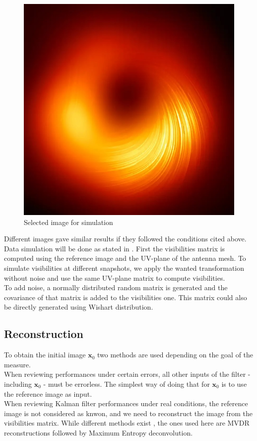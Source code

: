 \documentclass[titlepage]{article}
\newcommand{\x}{\boldsymbol{x}}
\begin{document}
	\begin{figure}[H]
		\centering
		\includegraphics[width=0.5\linewidth]{src/bh_square}
		\caption{Selected image for simulation}
		\label{fig:bhsquare}
	\end{figure}
	
	Different images gave similar results if they followed the conditions cited above.\\
	
	Data simulation will be done as stated in \cite{TER}. First the visibilities matrix is computed using the reference image and the UV-plane of the antenna mesh. To simulate visibilities at different snapshots, we apply the wanted transformation without noise and use the same UV-plane matrix to compute visibilities.\\
	
	To add noise, a normally distributed random matrix is generated and the covariance of that matrix is added to the visibilities one. This matrix could also be directly generated using Wishart distribution. \\ 
	
	\subsection{Reconstruction}
	
	To obtain the initial image $\x_0$ two methods are used depending on the goal of the measure. \\
	
	When reviewing performances under certain errors, all other inputs of the filter - including $\x_0$ - must be errorless. The simplest way of doing that for $\x_0$ is to use the reference image as input. \\
	
	When reviewing Kalman filter performances under real conditions, the reference image is not considered as knwon, and we need to reconstruct the image from the visibilities matrix. While different methods exist \cite{TER}, the ones used here are MVDR reconstructions followed by Maximum Entropy deconvolution.
	
\end{document}
